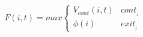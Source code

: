 \documentclass[12pt,letterpaper]{article}
\begin{document}
      \begin{equation}
      F(i,t)=max
      \begin{cases}
      V_{cont}(i,t)                                                                   & cont_{_i} \\
      \phi(i)                                                                         & exit_{_i}
      \end{cases}
      \label{breif}
      \end{equation}
      
          

\end{document}
